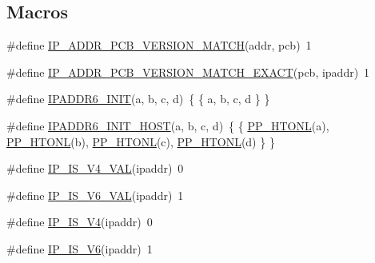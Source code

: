 \subsection*{Macros}
\begin{DoxyCompactItemize}
\item 
\#define \hyperlink{openmote-cc2538_2lwip_2src_2include_2lwip_2ip__addr_8h_a234cb2e45cd58a80bc3ef433d23f4c57}{I\+P\+\_\+\+A\+D\+D\+R\+\_\+\+P\+C\+B\+\_\+\+V\+E\+R\+S\+I\+O\+N\+\_\+\+M\+A\+T\+CH}(addr,  pcb)~1
\item 
\#define \hyperlink{openmote-cc2538_2lwip_2src_2include_2lwip_2ip__addr_8h_a81ed1fbe375d867d6e77c83976c07671}{I\+P\+\_\+\+A\+D\+D\+R\+\_\+\+P\+C\+B\+\_\+\+V\+E\+R\+S\+I\+O\+N\+\_\+\+M\+A\+T\+C\+H\+\_\+\+E\+X\+A\+CT}(pcb,  ipaddr)~1
\item 
\#define \hyperlink{openmote-cc2538_2lwip_2src_2include_2lwip_2ip__addr_8h_a1266e500b1db0b7cdc4b269cace49746}{I\+P\+A\+D\+D\+R6\+\_\+\+I\+N\+IT}(a,  b,  c,  d)~\{ \{ a, b, c, d \} \}
\item 
\#define \hyperlink{openmote-cc2538_2lwip_2src_2include_2lwip_2ip__addr_8h_adaff748da2b808995993dd3db5420f08}{I\+P\+A\+D\+D\+R6\+\_\+\+I\+N\+I\+T\+\_\+\+H\+O\+ST}(a,  b,  c,  d)~\{ \{ \hyperlink{openmote-cc2538_2lwip_2src_2include_2lwip_2def_8h_afea9c21aa1f56180cdf6fb42ef14a294}{P\+P\+\_\+\+H\+T\+O\+NL}(a), \hyperlink{openmote-cc2538_2lwip_2src_2include_2lwip_2def_8h_afea9c21aa1f56180cdf6fb42ef14a294}{P\+P\+\_\+\+H\+T\+O\+NL}(b), \hyperlink{openmote-cc2538_2lwip_2src_2include_2lwip_2def_8h_afea9c21aa1f56180cdf6fb42ef14a294}{P\+P\+\_\+\+H\+T\+O\+NL}(c), \hyperlink{openmote-cc2538_2lwip_2src_2include_2lwip_2def_8h_afea9c21aa1f56180cdf6fb42ef14a294}{P\+P\+\_\+\+H\+T\+O\+NL}(d) \} \}
\item 
\#define \hyperlink{openmote-cc2538_2lwip_2src_2include_2lwip_2ip__addr_8h_ab1a059f07bd9c50aa58447d963b823a1}{I\+P\+\_\+\+I\+S\+\_\+\+V4\+\_\+\+V\+AL}(ipaddr)~0
\item 
\#define \hyperlink{openmote-cc2538_2lwip_2src_2include_2lwip_2ip__addr_8h_a1578e34703e86711a7fb7dcc3857004d}{I\+P\+\_\+\+I\+S\+\_\+\+V6\+\_\+\+V\+AL}(ipaddr)~1
\item 
\#define \hyperlink{openmote-cc2538_2lwip_2src_2include_2lwip_2ip__addr_8h_abee5dab2191bb0f3355d7f30d1496f24}{I\+P\+\_\+\+I\+S\+\_\+\+V4}(ipaddr)~0
\item 
\#define \hyperlink{openmote-cc2538_2lwip_2src_2include_2lwip_2ip__addr_8h_a9bac7e938757f1d24df2404e8b57cb7d}{I\+P\+\_\+\+I\+S\+\_\+\+V6}(ipaddr)~1
\item 

\end{DoxyCompactItemize}
